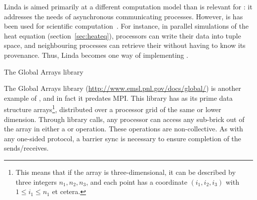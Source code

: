 Linda is aimed primarily at a different computation model than is
relevant for : it addresses the needs of
asynchronous communicating processes. However, is has been used for
scientific computation~\cite{Deshpande92efficientparallel}. For
instance, in parallel simulations of the heat equation
(section~\ref{sec:heateq}), processors can write their data into tuple
space, and neighbouring processes can retrieve their  without having to
know its provenance. Thus, Linda becomes one way of implementing
.


 {The Global Arrays library}

The Global Arrays library (\url{http://www.emsl.pnl.gov/docs/global/})
is another example of , and in fact
it predates MPI. This library has as its prime data structure
 arrays\footnote{This means that if the
  array is three-dimensional, it can be described by three integers
  $n_1,n_2,n_3$, and each point has a coordinate $(i_1,i_2,i_3)$ with
  $1\leq i_1\leq n_1$ et cetera.}, distributed over a processor grid
of the same or lower dimension. Through library calls, any processor
can access any sub-brick out of the array in either a  or
 operation. These operations are non-collective. As with any
one-sided protocol, a barrier sync is necessary to ensure completion
of the sends/receives.


